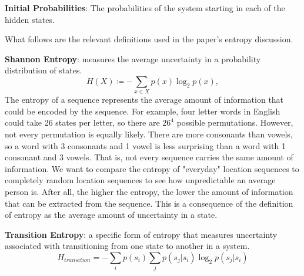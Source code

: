 \documentclass[11pt]{amsart}
\begin{document}
\textbf{Initial Probabilities}: The probabilities of the system starting in each of the hidden states.


What follows are the relevant definitions used in the paper's entropy discussion.

\textbf{Shannon Entropy}: measures the average uncertainty in a probability distribution of states.
\begin{equation}
    \label{entropyeq}
    H( X ) ≔ - \sum_{x ∈ X}p( x )\log_2 p( x ),
\end{equation}
The entropy of a sequence represents the average amount of information that could be encoded by the sequence.
For example, four letter words in English could take 26 states per letter, so there are $26^4$ possible permutations.
However, not every permutation is equally likely.
There are more consonants than vowels, so a word with 3 consonants and 1 vowel is less surprising than a word with 1 consonant and 3 vowels.
That is, not every sequence carries the same amount of information.
We want to compare the entropy of "everyday" location sequences to completely random location sequences to see how unpredictable an average person is.
After all, the higher the entropy, the lower the amount of information that can be extracted from the sequence.
This is a consequence of the definition of entropy as the average amount of uncertainty in a state.

\textbf{Transition Entropy}: a specific form of entropy that measures uncertainty associated with transitioning from one state to another in a system.
\begin{equation}
    \label{transition_entropy}
    H_{transition} = -\sum_i p( s_i )\sum_j p( s_j|s_i )\log_2 p( s_j|s_i )
\end{equation}
\end{document}
